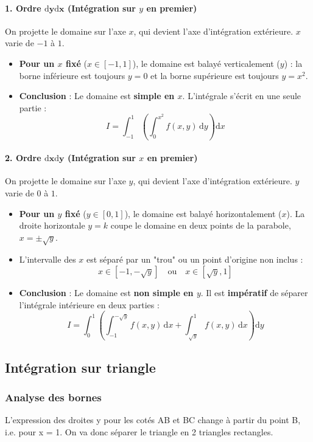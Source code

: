 \documentclass[french]{yLectureNote}
\newcommand{\dd}{\mathrm{d}}
\begin{document}
\paragraph*{1. Ordre $\mathbf{\dd y \dd x}$ (Intégration sur $y$ en premier)}
On projette le domaine sur l'axe $x$, qui devient l'axe d'intégration extérieure. $x$ varie de $-1$ à $1$.
\begin{itemize}
    \item \textbf{Pour un $x$ fixé} ($x \in [-1, 1]$), le domaine est balayé verticalement ($y$) : la borne inférieure est toujours $y=0$ et la borne supérieure est toujours $y=x^2$.
    \item \textbf{Conclusion} : Le domaine est \textbf{simple en $x$}. L'intégrale s'écrit en une seule partie :
    $$I = \int_{-1}^1 \left( \int_0^{x^2} f(x,y)\, \dd y \right) \dd x$$
\end{itemize}

\paragraph*{2. Ordre $\mathbf{\dd x \dd y}$ (Intégration sur $x$ en premier)}
On projette le domaine sur l'axe $y$, qui devient l'axe d'intégration extérieure. $y$ varie de $0$ à $1$.
\begin{itemize}
    \item \textbf{Pour un $y$ fixé} ($y \in [0, 1]$), le domaine est balayé horizontalement ($x$). La droite horizontale $y=k$ coupe le domaine en deux points de la parabole, $x=\pm\sqrt{y}$.
    \item L'intervalle des $x$ est séparé par un "trou" ou un point d'origine non inclus :
    $$x \in [-1, -\sqrt{y}] \quad \text{ou} \quad x \in [\sqrt{y}, 1]$$
    \item \textbf{Conclusion} : Le domaine est \textbf{non simple en $y$}. Il est \textbf{impératif} de séparer l'intégrale intérieure en deux parties :
    $$I = \int_0^1 \left( \int_{-1}^{-\sqrt{y}} f(x,y)\, \dd x + \int_{\sqrt{y}}^1 f(x,y)\, \dd x \right) \dd y$$
\end{itemize}
\subsection{Intégration sur triangle}
\subsubsection{Analyse des bornes}
L'expression des droites y pour les cotés AB et BC change à partir du point B, i.e. pour x = 1. On va donc séparer le triangle en 2 triangles rectangles.
\end{document}

